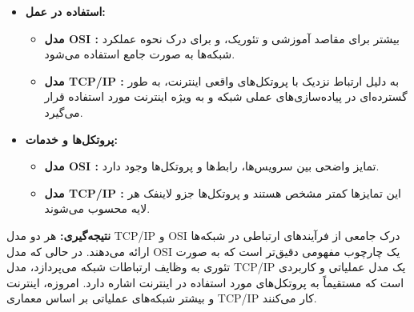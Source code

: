 \begin{itemize}
	\item \textbf{استفاده در عمل:}
	\begin{itemize}
		\item \textbf{مدل OSI :} بیشتر برای مقاصد آموزشی و تئوریک، و برای درک نحوه عملکرد شبکه‌ها به صورت جامع استفاده می‌شود.
		\item \textbf{مدل TCP/IP :} به دلیل ارتباط نزدیک با پروتکل‌های واقعی اینترنت، به طور گسترده‌ای در پیاده‌سازی‌های عملی شبکه و به ویژه اینترنت مورد استفاده قرار می‌گیرد.
	\end{itemize}
	
	\item \textbf{پروتکل‌ها و خدمات:}
	\begin{itemize}
		\item \textbf{مدل OSI :} تمایز واضحی بین سرویس‌ها، رابط‌ها و پروتکل‌ها وجود دارد.
		\item \textbf{مدل TCP/IP :} این تمایزها کمتر مشخص هستند و پروتکل‌ها جزو لاینفک هر لایه محسوب می‌شوند.
	\end{itemize}
\end{itemize}

\textbf{نتیجه‌گیری:}
هر دو مدل TCP/IP و OSI درک جامعی از فرآیندهای ارتباطی در شبکه‌ها ارائه می‌دهند. در حالی که مدل OSI یک چارچوب مفهومی دقیق‌تر است که به صورت تئوری به وظایف ارتباطات شبکه می‌پردازد، مدل TCP/IP یک مدل عملیاتی و کاربردی است که مستقیماً به پروتکل‌های مورد استفاده در اینترنت اشاره دارد. امروزه، اینترنت و بیشتر شبکه‌های عملیاتی بر اساس معماری TCP/IP کار می‌کنند.